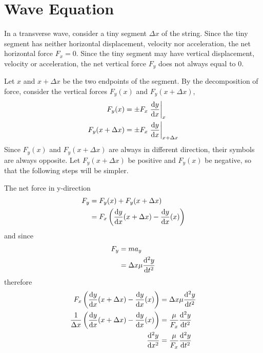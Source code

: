 \documentclass{note}
\begin{document}
\section{Wave Equation}

In a transverse wave, consider a tiny segment \(\Delta x\) of the string. Since the tiny segment has neither horizontal displacement, velocity nor acceleration, the net horizontal force \(F_x = 0\). Since the tiny segment may have vertical displacement, velocity or acceleration, the net vertical force \(F_y\) does not always equal to \(0\).

Let \(x\) and \(x + \Delta x\) be the two endpoints of the segment. By the decomposition of force, consider the vertical forces \(F_{y}(x)\) and \(F_{y}(x+\Delta x)\),
\begin{align*}
  F_y(x)            & = \pm F_x \eval{\dv{y}{x}}_x              \\
  F_y(x + \Delta x) & = \pm F_x \eval{\dv{y}{x}}_{x + \Delta x}
\end{align*}
Since \(F_y(x)\) and \(F_y(x + \Delta x)\) are always in different direction, their symbols are always opposite. Let \(F_y(x + \Delta x)\) be positive and \(F_y(x)\) be negative, so that the following steps will be simpler.

The net force in y-direction
\begin{align*}
  F_y
    & = F_y(x) + F_y(x + \Delta x)                                  \\
    & = F_x \left(\dv{y}{x}\/(x + \Delta x) - \dv{y}{x}\/(x)\right)
\end{align*}
and since
\begin{align*}
  F_y
    & = ma_y                      \\
    & = \Delta x \mu \dv[2]{y}{t}
\end{align*}
therefore
\begin{align*}
  F_x \left(\dv{y}{x}\/(x + \Delta x) - \dv{y}{x}\/(x)\right)                & = \Delta x \mu \dv[2]{y}{t}    \\
  \frac{1}{\Delta x} \left(\dv{y}{x}\/(x + \Delta x) - \dv{y}{x}\/(x)\right) & = \frac{\mu}{F_x} \dv[2]{y}{t} \\
  \dv[2]{y}{x}                                                               & = \frac{\mu}{F_x} \dv[2]{y}{t}
\end{align*}
\end{document}
